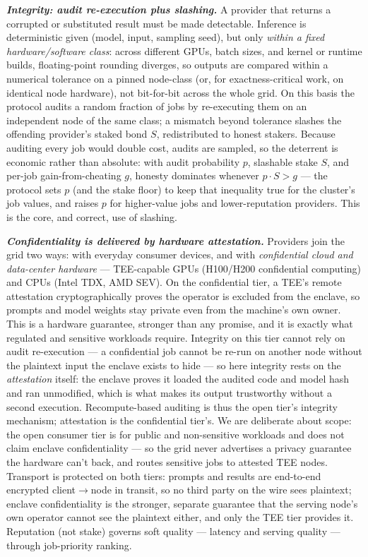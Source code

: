 \documentclass[11pt]{article}
\newcommand{\ph}[1]{\textbf{\textit{#1}}}
\begin{document}
\ph{Integrity: audit re-execution plus slashing.} A provider that returns a corrupted or substituted result must be made detectable. Inference is deterministic given (model, input, sampling seed), but only \textit{within a fixed hardware/software class}: across different GPUs, batch sizes, and kernel or runtime builds, floating-point rounding diverges, so outputs are compared within a numerical tolerance on a pinned node-class (or, for exactness-critical work, on identical node hardware), not bit-for-bit across the whole grid. On this basis the protocol audits a random fraction of jobs by re-executing them on an independent node of the same class; a mismatch beyond tolerance slashes the offending provider's staked bond $S$, redistributed to honest stakers. Because auditing every job would double cost, audits are sampled, so the deterrent is economic rather than absolute: with audit probability $p$, slashable stake $S$, and per-job gain-from-cheating $g$, honesty dominates whenever $p \cdot S > g$ --- the protocol sets $p$ (and the stake floor) to keep that inequality true for the cluster's job values, and raises $p$ for higher-value jobs and lower-reputation providers. This is the core, and correct, use of slashing.

\ph{Confidentiality is delivered by hardware attestation.} Providers join the grid two ways: with everyday consumer devices, and with \textit{confidential cloud and data-center hardware} --- TEE-capable GPUs (H100/H200 confidential computing) and CPUs (Intel TDX, AMD SEV). On the confidential tier, a TEE's remote attestation cryptographically proves the operator is excluded from the enclave, so prompts and model weights stay private even from the machine's own owner. This is a hardware guarantee, stronger than any promise, and it is exactly what regulated and sensitive workloads require. Integrity on this tier cannot rely on audit re-execution --- a confidential job cannot be re-run on another node without the plaintext input the enclave exists to hide --- so here integrity rests on the \textit{attestation} itself: the enclave proves it loaded the audited code and model hash and ran unmodified, which is what makes its output trustworthy without a second execution. Recompute-based auditing is thus the open tier's integrity mechanism; attestation is the confidential tier's. We are deliberate about scope: the open consumer tier is for public and non-sensitive workloads and does not claim enclave confidentiality --- so the grid never advertises a privacy guarantee the hardware can't back, and routes sensitive jobs to attested TEE nodes. Transport is protected on both tiers: prompts and results are end-to-end encrypted client$\rightarrow$node in transit, so no third party on the wire sees plaintext; enclave confidentiality is the stronger, separate guarantee that the serving node's own operator cannot see the plaintext either, and only the TEE tier provides it. Reputation (not stake) governs soft quality --- latency and serving quality --- through job-priority ranking.
\end{document}

